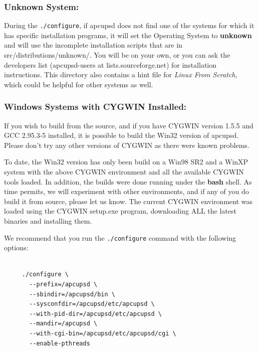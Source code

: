 \subsubsection*{Unknown System:}

\label{index-Unknown-System-53}
\label{index-OS_002c-Unknown-System-54}
During the {\tt ./configure}, if apcupsd does not find one of the systems for
which it has specific installation programs, it will set the Operating System
to {\bf unknown} and will use the incomplete installation scripts that are in
\lt{}src\gt{}/distributions/unknown/. You will be on your own, or you can ask
the developers list (apcupsd-users at lists.sourceforge.net) for installation
instructions. This directory also contains a hint file for {\it Linux From
Scratch}, which could be helpful for other systems as well. 

\label{Windows-Systems-with-CYGWIN-Installed}

\subsubsection*{Windows Systems with CYGWIN Installed:}

\label{index-Windows-55}
\label{index-OS_002c-Windows-56}
If you wish to build from the source, and if you have CYGWIN version 1.5.5 and
GCC 2.95.3-5 installed, it is possible to build the Win32 version of apcupsd.
Please don't try any other versions of CYGWIN as there were known problems.  

To date, the Win32 version has only been build on a Win98 SR2 and a WinXP
system with the above CYGWIN environment and all the available CYGWIN tools
loaded. In addition, the builds were done running under the {\bf bash} shell.
As time permits, we will experiment with other environments, and if any of you
do build it from source, please let us know. The current CYGWIN environment
was loaded using the CYGWIN setup.exe program, downloading ALL the latest
binaries and installing them.  

We recommend that you run the {\tt ./configure} command with the following
options: 

\footnotesize
\begin{verbatim}
     
     ./configure \
       --prefix=/apcupsd \
       --sbindir=/apcupsd/bin \
       --sysconfdir=/apcupsd/etc/apcupsd \
       --with-pid-dir=/apcupsd/etc/apcupsd \
       --mandir=/apcupsd \
       --with-cgi-bin=/apcupsd/etc/apcupsd/cgi \
       --enable-pthreads
\end{verbatim}
\normalsize

